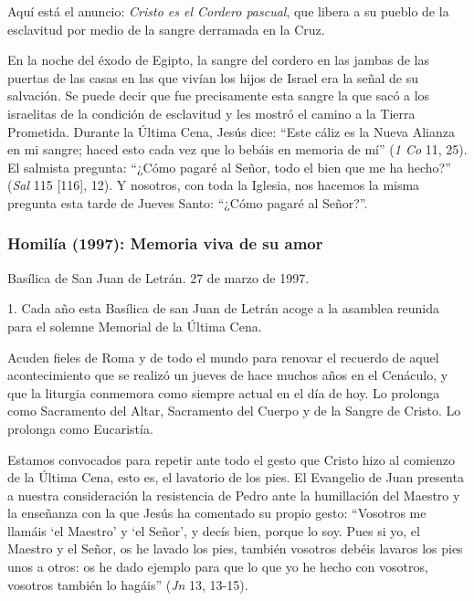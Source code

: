 			\begin{body}Aquí está el anuncio: \textit{Cristo es el Cordero pascual}, que libera a su pueblo de la esclavitud por medio de la sangre derramada en la Cruz. \end{body}
			
			\begin{body}En la noche del éxodo de Egipto, la sangre del cordero en las jambas de las puertas de las casas en las que vivían los hijos de Israel era la señal de su salvación. Se puede decir que fue precisamente esta sangre la que sacó a los israelitas de la condición de esclavitud y les mostró el camino a la Tierra Prometida. Durante la Última Cena, Jesús dice: “Este cáliz es la Nueva Alianza en mi sangre; haced esto cada vez que lo bebáis en memoria de mí” (\textit{1 Co }11, 25). El salmista pregunta: “¿Cómo pagaré al Señor, todo el bien que me ha hecho?” (\textit{Sal} 115 [116], 12). Y nosotros, con toda la Iglesia, nos hacemos la misma pregunta esta tarde de Jueves Santo: “¿Cómo pagaré al Señor?”.\end{body}
			
			\subsubsection{Homilía (1997): Memoria viva de su amor}
			
			\begin{referencia}Basílica de San Juan de Letrán. 27 de marzo de 1997.\end{referencia}
			
			\begin{body} 1. Cada año esta Basílica de san Juan de Letrán acoge a la asamblea reunida para el solemne Memorial de la Última Cena.\end{body}
			
			\begin{body}Acuden fieles de Roma y de todo el mundo para renovar el recuerdo de aquel acontecimiento que se realizó un jueves de hace muchos años en el Cenáculo, y que la liturgia conmemora como siempre actual en el día de hoy. Lo prolonga como Sacramento del Altar, Sacramento del Cuerpo y de la Sangre de Cristo. Lo prolonga como Eucaristía.\end{body}
			
			\begin{body}Estamos convocados para repetir ante todo el gesto que Cristo hizo al comienzo de la Última Cena, esto es, el lavatorio de los pies. El Evangelio de Juan presenta a nuestra consideración la resistencia de Pedro ante la humillación del Maestro y la enseñanza con la que Jesús ha comentado su propio gesto: “Vosotros me llamáis ‘el Maestro’ y ‘el Señor’, y decís bien, porque lo soy. Pues si yo, el Maestro y el Señor, os he lavado los pies, también vosotros debéis lavaros los pies unos a otros: os he dado ejemplo para que lo que yo he hecho con vosotros, vosotros también lo hagáis” (\textit{Jn} 13, 13-15).\end{body}
			
